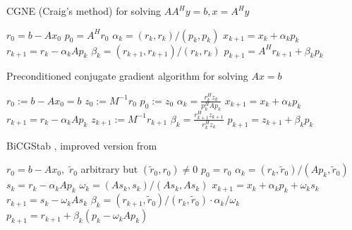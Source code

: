 \documentclass[10pt]{article}
\begin{document}
\begin{algorithm}[H]
  \caption{CGNE (Craig's method) for solving $AA^H y=b, x=A^H y$ \citep[algorithm 8.5]{Saad_2003_IMS}}
  \begin{algorithmic}[1]
    \State $r_0=b-Ax_0$
    \State $p_0 = A^H r_0$
    \State $\alpha_k = (r_k , r_k)/(p_k, p_k )$
    \State $x_{k+1} = x_k + \alpha_k  p_k$
    \State $r_{k+1} = r_k-\alpha_k Ap_k$
    \State $\beta_k = (r_{k+1},r_{k+1})/(r_k,r_k)$
    \State $p_{k+1}=A^H r_{k+1}+\beta_k p_k$
    \EndFor
  \end{algorithmic}
\end{algorithm}

\begin{algorithm}[H]
  \caption{Preconditioned conjugate gradient algorithm for solving $Ax=b$ \citep[algorithm 9.1]{Saad_2003_IMS}}
  \begin{algorithmic}[1]
  \State $r_0:=b-A x_0=b$
  \State $z_0:=M^{-1}r_0$
  \State $p_0:=z_0$
    \State $\alpha_k=\frac{r_k^H z_k}{p_k^H Ap_k}$
    \State $x_{k+1}=x_k + \alpha_k p_k$
    \State $r_{k+1}=r_k - \alpha_k A p_k$
    \State $z_{k+1}:=M^{-1}r_{k+1}$
    \State $\beta_{k} = \frac{r_{k+1}^H z_{k+1}}{r_k^H z_k}$\;
    \State $p_{k+1}=z_{k+1} + \beta_k p_k$\;
    \EndFor
  \end{algorithmic}
\end{algorithm}


\begin{algorithm}[H]
  \caption{BiCGStab \citep{chen2016analysis}, improved version from \citep{van1992bicgstab}}\label{alg:CG}
  \begin{algorithmic}[1]
    \State $r_0=b-Ax_0,$ $\tilde{r}_0$ arbitrary but $(\tilde{r}_0,r_0)\neq 0$
    \State $p_0 = r_0$
    \State $\alpha_k = (r_k , \tilde{r}_0 )/(Ap_k , \tilde{r}_0 )$
    \State $s_k=r_k-\alpha_k Ap_k$ 
    \State $\omega_k = (As_k , s_k )/(As_k , As_k ) $
    \State $x_{k+1} = x_k + \alpha_k  p_k + \omega_k s_k$
    \State $r_{k+1}=s_k-\omega_k As_k$
    \State $\beta_k = (r_{k+1},\tilde{r}_0 )/(r_k,\tilde{r}_0 )\cdot \alpha_k/\omega_k$
    \State $p_{k+1}=r_{k+1}+\beta_k(p_k-\omega_k Ap_k)$
    \EndFor
  \end{algorithmic}
\end{algorithm}
\end{document}
